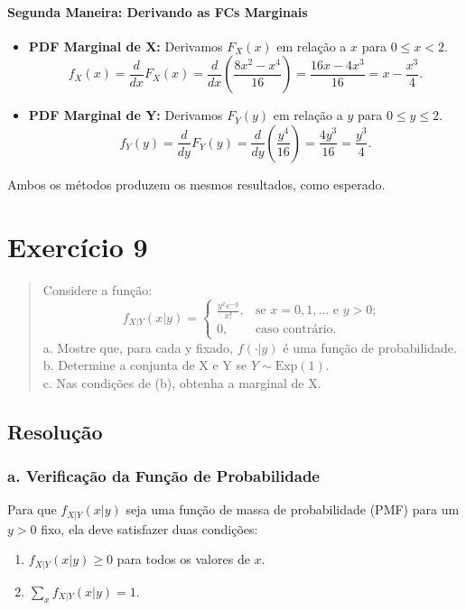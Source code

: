 \documentclass[12pt]{article}
\begin{document}
\paragraph{Segunda Maneira: Derivando as FCs Marginais}
\begin{itemize}
    \item \textbf{PDF Marginal de X:} Derivamos $F_X(x)$ em relação a $x$ para $0 \le x < 2$.
    \[ f_X(x) = \frac{d}{dx} F_X(x) = \frac{d}{dx} \left( \frac{8x^2-x^4}{16} \right) = \frac{16x - 4x^3}{16} = x - \frac{x^3}{4}. \]
    \item \textbf{PDF Marginal de Y:} Derivamos $F_Y(y)$ em relação a $y$ para $0 \le y \le 2$.
    \[ f_Y(y) = \frac{d}{dy} F_Y(y) = \frac{d}{dy} \left( \frac{y^4}{16} \right) = \frac{4y^3}{16} = \frac{y^3}{4}. \]
\end{itemize}
Ambos os métodos produzem os mesmos resultados, como esperado. \hfill \qedsymbol

\section{Exercício 9}

\begin{quote}
Considere a função:
\[ f_{X|Y}(x|y) = \begin{cases} \frac{y^x e^{-y}}{x!}, & \text{se } x = 0, 1, \dots \text{ e } y > 0; \\ 0, & \text{caso contrário.} \end{cases} \]
a. Mostre que, para cada y fixado, $f(\cdot|y)$ é uma função de probabilidade. \\
b. Determine a conjunta de X e Y se $Y \sim \text{Exp}(1)$. \\
c. Nas condições de (b), obtenha a marginal de X.
\end{quote}

\subsection*{Resolução}

\subsubsection*{a. Verificação da Função de Probabilidade}
Para que $f_{X|Y}(x|y)$ seja uma função de massa de probabilidade (PMF) para um $y>0$ fixo, ela deve satisfazer duas condições:
\begin{enumerate}
    \item $f_{X|Y}(x|y) \ge 0$ para todos os valores de $x$.
    \item $\sum_{x} f_{X|Y}(x|y) = 1$.
\end{enumerate}
\end{document}
